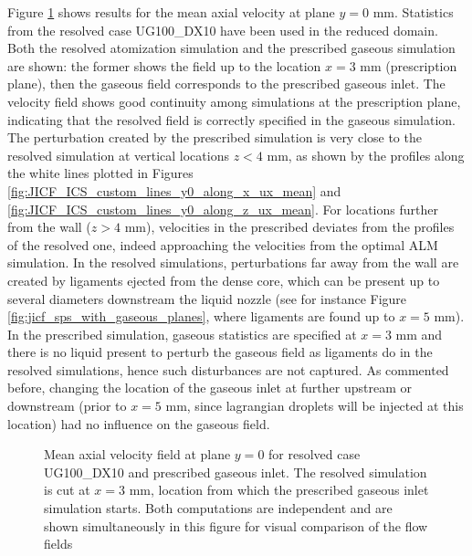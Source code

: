 Figure \ref{fig:custom_gas_fields_plane_Y} shows results for the mean axial velocity at plane $y = 0$ mm. Statistics from the resolved case UG100\_DX10 have been used in the reduced domain. Both the resolved atomization simulation and the prescribed gaseous simulation are shown: the former shows the field up to the location $x = 3$ mm (prescription plane), then the gaseous field corresponds to the prescribed gaseous inlet. The velocity field shows good continuity among simulations at the prescription plane, indicating that the resolved field is correctly specified in the gaseous simulation. The perturbation created by the prescribed simulation is very close to the resolved simulation at vertical locations $z < 4$ mm, as shown by the profiles along the white lines plotted in Figures \ref{fig:JICF_ICS_custom_lines_y0_along_x_ux_mean} and \ref{fig:JICF_ICS_custom_lines_y0_along_z_ux_mean}. For locations further from the wall ($z > 4$ mm), velocities in the prescribed deviates from the profiles of the resolved one, indeed approaching the velocities from the optimal ALM simulation. In the resolved simulations, perturbations far away from the wall are created by ligaments ejected from the dense core, which can be present up to several diameters downstream the liquid nozzle (see for instance Figure \ref{fig:jicf_sps_with_gaseous_planes}, where ligaments are found up to $x = 5$ mm). In the prescribed simulation, gaseous statistics are specified at $x = 3$ mm and there is no liquid present to perturb the gaseous field as ligaments do in the resolved simulations, hence such disturbances are not captured. As commented before, changing the location of the gaseous inlet at further upstream or downstream (prior to $x = 5$ mm, since lagrangian droplets will be injected at this location) had no influence on the gaseous field.

\begin{figure}[h!]	
	\centering	{}
	\caption[Mean axial velocity field at plane $y = 0$ for resolved case UG100\_DX10 and prescribed gaseous inlet]{Mean axial velocity field at plane $y = 0$ for resolved case UG100\_DX10 and prescribed gaseous inlet. The resolved simulation is cut at $x = 3$ mm, location from which the prescribed gaseous inlet simulation starts. Both computations are independent and are shown simultaneously in this figure for visual comparison of the flow fields}
	\label{fig:custom_gas_fields_plane_Y}
\end{figure}


